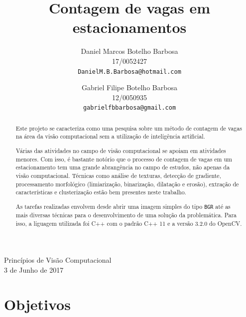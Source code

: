 \documentclass[10pt,twocolumn,letterpaper]{article}
\begin{document}
\title{Contagem de vagas em estacionamentos}

Princípios de Visão Computacional\\
3 de Junho de 2017

\author{Daniel Marcos Botelho Barbosa\\
17/0052427\\
{\tt\small DanielM.B.Barbosa@hotmail.com}\\
\and
Gabriel Filipe Botelho Barbosa\\
12/0050935\\
{\tt\small gabrielfbbarbosa@gmail.com}
}

\maketitle






\begin{abstract}
	Este projeto se caracteriza como uma pesquisa sobre um método de contagem
de vagas na área da visão computacional sem a utilização de inteligência artificial.

	Várias das atividades no campo de visão computacional se apoiam em atividades
menores. Com isso, é bastante notório que o processo de contagem de vagas em um
estacionamento tem uma grande abrangência no campo de estudos, não apenas da
visão computacional. Técnicas como análise de texturas, detecção de gradiente,
processamento morfológico (limiarização, binarização, dilatação e erosão), extração
de características e clusterização estão bem presentes neste trabalho.

	As tarefas realizadas envolvem desde abrir uma imagem simples do tipo \verb'BGR'
até as mais diversas técnicas para o desenvolvimento de uma solução da problemática.
Para isso, a liguagem utilizada foi C++ com o padrão C++ 11 e a versão 3.2.0 do OpenCV.\\
\end{abstract}





\section{Objetivos}
\end{document}
